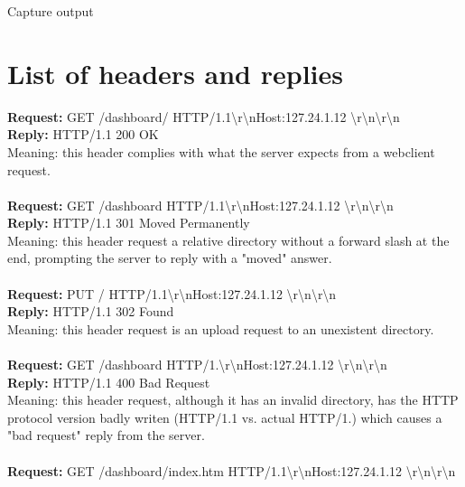 \documentclass[11pt,a4paper]{report}
\begin{document}
        Capture output

    \section{List of headers and replies}
            \textbf{Request:} GET /dashboard/ HTTP/1.1\textbackslash r\textbackslash nHost:127.24.1.12 \textbackslash r\textbackslash n\textbackslash r\textbackslash n \\
            \textbf{Reply:} HTTP/1.1 200 OK \\
                Meaning: this header complies with what the server expects from a webclient request. \\ \\
            \textbf{Request:} GET /dashboard HTTP/1.1\textbackslash r\textbackslash nHost:127.24.1.12 \textbackslash r\textbackslash n\textbackslash r\textbackslash n \\
            \textbf{Reply:} HTTP/1.1 301 Moved Permanently \\
                Meaning: this header request a relative directory without a forward slash at the end, prompting the server to reply with a "moved" answer. \\ \\
            \textbf{Request:} PUT / HTTP/1.1\textbackslash r\textbackslash nHost:127.24.1.12 \textbackslash r\textbackslash n\textbackslash r\textbackslash n \\
            \textbf{Reply:} HTTP/1.1 302 Found \\
                Meaning: this header request is an upload request to an unexistent directory. \\ \\
            \textbf{Request:} GET /dashboard HTTP/1.\textbackslash r\textbackslash nHost:127.24.1.12 \textbackslash r\textbackslash n\textbackslash r\textbackslash n \\
            \textbf{Reply:} HTTP/1.1 400 Bad Request \\
                Meaning: this header request, although it has an invalid directory, has the HTTP protocol version badly writen (HTTP/1.1 vs. actual HTTP/1.) which causes a "bad request" reply from the server. \\ \\
            \textbf{Request:} GET /dashboard/index.htm HTTP/1.1\textbackslash r\textbackslash nHost:127.24.1.12 \textbackslash r\textbackslash n\textbackslash r\textbackslash n \\
\end{document}
